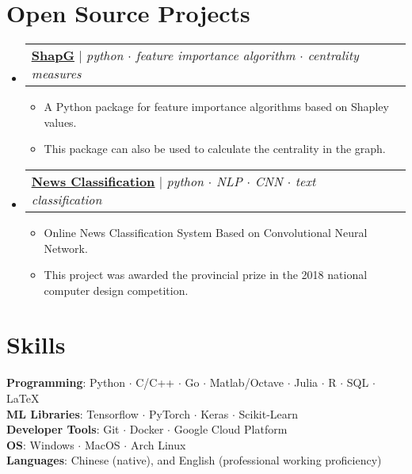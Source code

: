 \documentclass[letterpaper,10pt]{article}
\makeatletter
\newcommand{\link}[2]{\href{#1}{\color{blue}\underline{#2}}}
\newcommand{\resumeItem}[1]{
  \item\small{
    {#1 \vspace{-2pt}}
  }
}
\newcommand{\resumeProjectHeading}[2]{
  \item
  \begin{tabular*}{0.97\textwidth}{l@{\extracolsep{\fill}}r}
    \small#1 & #2 \\
  \end{tabular*}\vspace{-7pt}
}
\newenvironment{resumeSubHeadingList}{\begin{itemize}[leftmargin=0.15in, label={}]}{\end{itemize}}
\newenvironment{resumeItemList}{\begin{itemize}}{\end{itemize}}
\makeatother
\begin{document}
\section{Open Source Projects}
\begin{resumeSubHeadingList}

  \resumeProjectHeading{
    \link{https://github.com/vectorsss/shapG}{\textbf{ShapG}} $|$
    \emph{python $\cdot$ feature importance algorithm $\cdot$ centrality
          measures}}{}
  \begin{resumeItemList}
    \resumeItem{A Python package for feature importance algorithms based on
                Shapley values.}
    \resumeItem{This package can also be used to calculate the centrality in
                the graph.}
  \end{resumeItemList}

  \newpage
  \resumeProjectHeading{
    \link{https://github.com/vectorsss/news_classification}{\textbf{News
          Classification}} $|$
    \emph{python $\cdot$ NLP $\cdot$ CNN $\cdot$ text classification}}{}
  \begin{resumeItemList}
    \resumeItem{Online News Classification System Based on Convolutional Neural
                Network.}
    \resumeItem{This project was awarded the provincial  prize in the
                2018 national computer design competition.}
  \end{resumeItemList}
\end{resumeSubHeadingList}

\section{Skills}
\begin{itemize}[leftmargin=0.15in, label={}]
  \small{\item{
        \textbf{Programming}{: Python $\cdot$ C/C++ $\cdot$ Go $\cdot$ Matlab/Octave $\cdot$ Julia $\cdot$ R $\cdot$ SQL $\cdot$ \LaTeX} \\
        \textbf{ML Libraries}{: Tensorflow $\cdot$  PyTorch $\cdot$ Keras $\cdot$  Scikit-Learn} \\
        \textbf{Developer Tools}{: Git $\cdot$ Docker $\cdot$  Google Cloud Platform} \\
        \textbf{OS}{: Windows $\cdot$ MacOS $\cdot$ Arch Linux} \\
        \textbf{Languages}{: Chinese (native), and English (professional working proficiency)}
        }}
\end{itemize}
\end{document}
